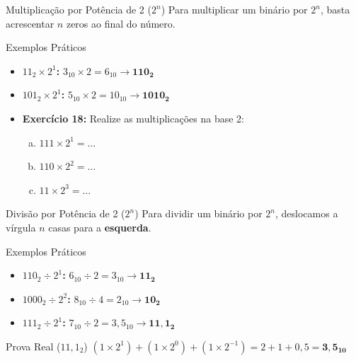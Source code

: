 \begin{frame}{Multiplicação por Potência de 2 ($2^n$)}
    Para multiplicar um binário por $2^n$, basta acrescentar $n$ zeros ao final do número.

    \begin{exampleblock}{Exemplos Práticos}
        \begin{itemize}
            \item \textbf{$11_2 \times 2^1$:} $3_{10} \times 2 = 6_{10} \rightarrow \mathbf{110_2}$
            \item \textbf{$101_2 \times 2^1$:} $5_{10} \times 2 = 10_{10} \rightarrow \mathbf{1010_2}$
        \end{itemize}
    \end{exampleblock}

    \begin{itemize}
        \item \textbf{Exercício 18:} Realize as multiplicações na base 2:
              \begin{enumerate}[a)]
                  \item $111 \times 2^1 = \dots$
                  \item $110 \times 2^2 = \dots$
                  \item $11 \times 2^3 = \dots$
              \end{enumerate}
    \end{itemize}
\end{frame}

\begin{frame}{Divisão por Potência de 2 ($2^n$)}
    Para dividir um binário por $2^n$, deslocamos a vírgula $n$ casas para a \textbf{esquerda}.

    \begin{exampleblock}{Exemplos Práticos}
        \begin{itemize}
            \item \textbf{$110_2 \div 2^1$:} $6_{10} \div 2 = 3_{10} \rightarrow \mathbf{11_2}$
            \item \textbf{$1000_2 \div 2^2$:} $8_{10} \div 4 = 2_{10} \rightarrow \mathbf{10_2}$
            \item \textbf{$111_2 \div 2^1$:} $7_{10} \div 2 = 3,5_{10} \rightarrow \mathbf{11,1_2}$
        \end{itemize}
    \end{exampleblock}

    \begin{block}{Prova Real ($11,1_2$)}
        $ (1 \times 2^1) + (1 \times 2^0) + (1 \times 2^{-1}) = 2 + 1 + 0,5 = \mathbf{3,5_{10}} $
    \end{block}
\end{frame}

